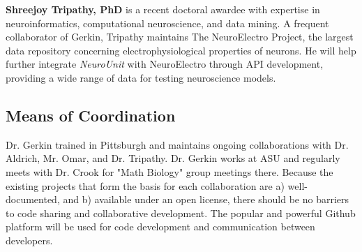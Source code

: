\documentclass[11pt,letterpaper]{article}
\begin{document}
\textbf{Shreejoy Tripathy, PhD} is a recent doctoral awardee with expertise in neuroinformatics, computational neuroscience, and data mining.  A frequent collaborator of Gerkin, Tripathy maintains The NeuroElectro Project, the largest data repository concerning electrophysiological properties of neurons.  He will help further integrate \textit{NeuroUnit} with NeuroElectro through API development, providing a wide range of data for testing neuroscience models.  

\subsection{Means of Coordination}
Dr. Gerkin trained in Pittsburgh and maintains ongoing collaborations with Dr. Aldrich, Mr. Omar, and Dr. Tripathy.  Dr. Gerkin works at ASU and regularly meets with Dr. Crook for "Math Biology" group meetings there.  Because the existing projects that form the basis for each collaboration are a) well-documented, and b) available under an open license, there should be no barriers to code sharing and collaborative development.  The popular and powerful Github platform will be used for code development and communication between developers.

\end{document}
